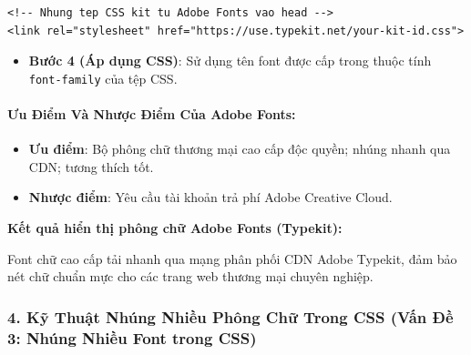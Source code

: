 \documentclass[11pt,oneside]{book}
\newcommand{\codeinline}[1]{\textcolor{accentOrange}{\texttt{#1}}}
\begin{document}
\begin{codeWindow}
\begin{lstlisting}[language=HTML5]
<!-- Nhung tep CSS kit tu Adobe Fonts vao head -->
<link rel="stylesheet" href="https://use.typekit.net/your-kit-id.css">
\end{lstlisting}
\end{codeWindow}

\begin{itemize}[leftmargin=1.5em, itemsep=3pt, parsep=0pt]
    \item \textbf{Bước 4 (Áp dụng CSS)}: Sử dụng tên font được cấp trong thuộc tính \codeinline{font-family} của tệp CSS.
\end{itemize}

\paragraph{Ưu Điểm Và Nhược Điểm Của Adobe Fonts:}
\begin{itemize}[leftmargin=1.5em, itemsep=3pt, parsep=0pt]
    \item \textbf{Ưu điểm}: Bộ phông chữ thương mại cao cấp độc quyền; nhúng nhanh qua CDN; tương thích tốt.
    \item \textbf{Nhược điểm}: Yêu cầu tài khoản trả phí Adobe Creative Cloud.
\end{itemize}

\begin{browserWindow}
\begin{tcolorbox}[arc=4pt, colback=white, colframe=primaryBlue!30, boxrule=0.8pt, top=10pt, bottom=10pt, left=12pt, right=12pt]
  {\sffamily\bfseries\color{primaryBlue} Kết quả hiển thị phông chữ Adobe Fonts (Typekit):}\par\vspace{6pt}
  {\sffamily\fontsize{13}{17}\selectfont\color{darkgray} Font chữ cao cấp tải nhanh qua mạng phân phối CDN Adobe Typekit, đảm bảo nét chữ chuẩn mực cho các trang web thương mại chuyên nghiệp.}
\end{tcolorbox}
\end{browserWindow}

\subsubsection{4. Kỹ Thuật Nhúng Nhiều Phông Chữ Trong CSS (Vấn Đề 3: Nhúng Nhiều Font trong CSS)}
\end{document}
